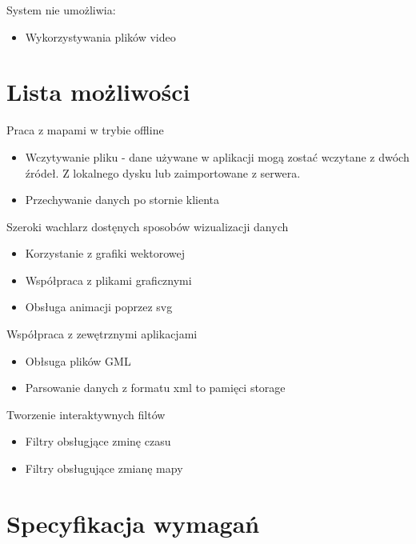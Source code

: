 System nie umożliwia:
\begin{itemize}
\item
Wykorzystywania plików video

\end{itemize}

\section{Lista możliwości}
\label{sec:listamozliwosci}

Praca z mapami w trybie offline
\begin{itemize}
\item
Wczytywanie pliku - dane używane w aplikacji mogą zostać wczytane z dwóch źródeł. Z lokalnego dysku lub zaimportowane z serwera.

\item
Przechywanie danych po stornie klienta

\end{itemize}

Szeroki wachlarz dostęnych sposobów wizualizacji danych
\begin{itemize}
\item
Korzystanie z grafiki wektorowej

\item
Współpraca z plikami graficznymi

\item
Obsługa animacji poprzez svg

\end{itemize}

Współpraca z zewętrznymi aplikacjami
\begin{itemize}
\item
Obłsuga plików GML

\item
Parsowanie danych z formatu xml to pamięci storage

\end{itemize}

Tworzenie interaktywnych filtów
\begin{itemize}
\item
Filtry obsługjące zminę czasu

\item
Filtry obsługujące zmianę mapy

\end{itemize}


\section{Specyfikacja wymagań}
\label{sec:specyfikacja wymagan}

